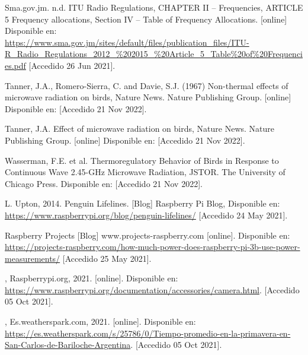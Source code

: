 \begin{flushleft}
\begin{thebibliography}{9}
Sma.gov.jm. n.d. ITU Radio Regulations, CHAPTER II – Frequencies, ARTICLE 5 Frequency allocations, Section IV – Table of Frequency Allocations. [online] Disponible en: \href{https://www.sma.gov.jm/sites/default/files/publication_files/ITU-R_Radio_Regulations_2012_\%202015_\%20Article_5_Table\%20of\%20Frequencies.pdf}{https://www.sma.gov.jm/sites/default/files/publication\_files/ITU-R\_Radio\_Regulations\_2012\_\%202015\_\%20Article\_5\_Table\%20of\%20Frequencies.pdf} [Accedido 26 Jun 2021].

Tanner, J.A., Romero-Sierra, C. and Davie, S.J. (1967) Non-thermal effects of microwave radiation on birds, Nature News. Nature Publishing Group. [online] Disponible en:  [Accedido 21 Nov 2022].

Tanner, J.A. Effect of microwave radiation on birds, Nature News. Nature Publishing Group. [online] Disponible en:  [Accedido 21 Nov 2022].

Wasserman, F.E. et al. Thermoregulatory Behavior of Birds in Response to Continuous Wave 2.45-GHz Microwave Radiation, JSTOR. The University of Chicago Press. Disponible en:  [Accedido 21 Nov 2022].

L. Upton, 2014. Penguin Lifelines. [Blog] Raspberry Pi Blog, Disponible en: \href{https://www.raspberrypi.org/blog/penguin-lifelines/}{https://www.raspberrypi.org/blog/penguin-lifelines/} [Accedido 24 May 2021].

Raspberry Projects [Blog] www.projects-raspberry.com [online]. Disponible en: \href{https://projects-raspberry.com/how-much-power-does-raspberry-pi-3b-use-power-measurements/}{https://projects-raspberry.com/how-much-power-does-raspberry-pi-3b-use-power-measurements/} [Accedido 25 May 2021].

, Raspberrypi.org, 2021. [online]. Disponible en: \href{https://www.raspberrypi.org/documentation/accessories/camera.html}{https://www.raspberrypi.org/documentation/accessories/camera.html}. [Accedido 05  Oct 2021].

, Es.weatherspark.com, 2021. [online]. Disponible en: \href{https://es.weatherspark.com/s/25786/0/Tiempo-promedio-en-la-primavera-en-San-Carlos-de-Bariloche-Argentina}{https://es.weatherspark.com/s/25786/0/Tiempo-promedio-en-la-primavera-en-San-Carlos-de-Bariloche-Argentina}. [Accedido 05 Oct 2021].


\end{thebibliography}
\end{flushleft}
